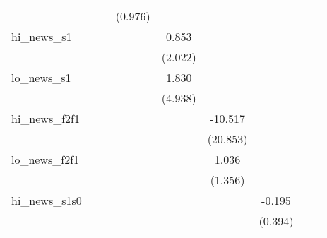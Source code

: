 {\begin{tabular}{l*{8}{c}}
            &                     &                     &     (0.976)         &                     &                     &                     &                     &                     \\
\addlinespace
hi\_news\_s1  &                     &                     &                     &       0.853         &                     &                     &                     &                     \\
            &                     &                     &                     &     (2.022)         &                     &                     &                     &                     \\
\addlinespace
lo\_news\_s1  &                     &                     &                     &       1.830         &                     &                     &                     &                     \\
            &                     &                     &                     &     (4.938)         &                     &                     &                     &                     \\
\addlinespace
hi\_news\_f2f1&                     &                     &                     &                     &     -10.517         &                     &                     &                     \\
            &                     &                     &                     &                     &    (20.853)         &                     &                     &                     \\
\addlinespace
lo\_news\_f2f1&                     &                     &                     &                     &       1.036         &                     &                     &                     \\
            &                     &                     &                     &                     &     (1.356)         &                     &                     &                     \\
\addlinespace
hi\_news\_s1s0&                     &                     &                     &                     &                     &      -0.195         &                     &                     \\
            &                     &                     &                     &                     &                     &     (0.394)         &                     &                     \\

\end{tabular}}
